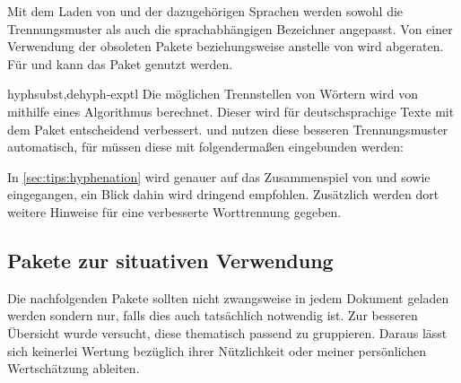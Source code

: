 \begin{packages}
  Mit dem Laden von  und der dazugehörigen Sprachen werden 
  sowohl die Trennungsmuster als auch die sprachabhängigen Bezeichner angepasst.
  Von einer Verwendung der obsoleten Pakete  beziehungsweise 
   anstelle von  wird abgeraten. Für 
   und  kann das Paket  
  genutzt werden.
\item[hyphsubst,dehyph-exptl]
  Die möglichen Trennstellen von Wörtern wird von  mithilfe 
  eines Algorithmus berechnet. Dieser wird für deutschsprachige Texte mit dem 
  Paket  entscheidend verbessert.  und 
   nutzen diese besseren Trennungsmuster automatisch, für 
   müssen diese mit folgendermaßen eingebunden werden:
  \begin{Code}
    \usepackage[ngerman=ngerman-x-latest]{hyphsubst}
  \end{Code}\vspace{-\baselineskip}%
  In \autoref{sec:tips:hyphenation} wird genauer auf das Zusammenspiel von 
   und  sowie  eingegangen, 
  ein Blick dahin wird dringend empfohlen. Zusätzlich werden dort weitere 
  Hinweise für eine verbesserte Worttrennung gegeben.
\end{packages}



\subsection{Pakete zur situativen Verwendung}
%
Die nachfolgenden Pakete sollten nicht zwangsweise in jedem Dokument geladen 
werden sondern nur, falls dies auch tatsächlich notwendig ist. Zur besseren 
Übersicht wurde versucht, diese thematisch passend zu gruppieren. Daraus lässt 
sich keinerlei Wertung bezüglich ihrer Nützlichkeit oder meiner persönlichen 
Wertschätzung ableiten.



